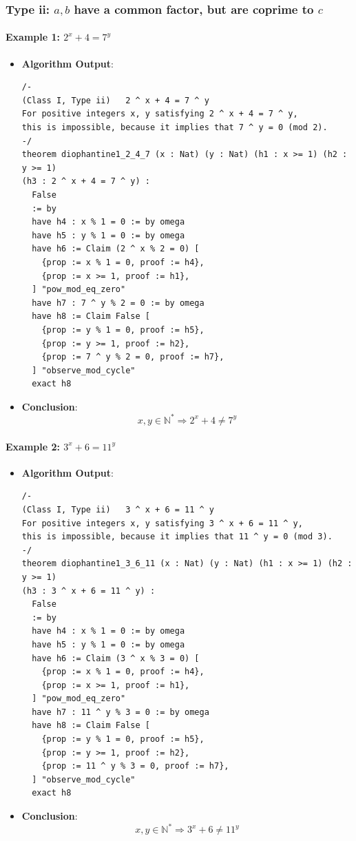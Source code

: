 \documentclass{article}
\begin{document}
\subsubsection{Type ii: $a, b$ have a common factor, but are coprime to $c$}
\paragraph{Example 1: $2^x+4=7^y$}
\begin{itemize}
\item \textbf{Algorithm Output}:
    \begin{verbatim}
/-
(Class I, Type ii)   2 ^ x + 4 = 7 ^ y
For positive integers x, y satisfying 2 ^ x + 4 = 7 ^ y,
this is impossible, because it implies that 7 ^ y = 0 (mod 2).
-/
theorem diophantine1_2_4_7 (x : Nat) (y : Nat) (h1 : x >= 1) (h2 : y >= 1) 
(h3 : 2 ^ x + 4 = 7 ^ y) :      
  False
  := by
  have h4 : x % 1 = 0 := by omega
  have h5 : y % 1 = 0 := by omega
  have h6 := Claim (2 ^ x % 2 = 0) [
    {prop := x % 1 = 0, proof := h4},
    {prop := x >= 1, proof := h1},
  ] "pow_mod_eq_zero"
  have h7 : 7 ^ y % 2 = 0 := by omega
  have h8 := Claim False [
    {prop := y % 1 = 0, proof := h5},
    {prop := y >= 1, proof := h2},
    {prop := 7 ^ y % 2 = 0, proof := h7},
  ] "observe_mod_cycle"
  exact h8
    \end{verbatim}
    \item \textbf{Conclusion}:
    \[ x, y \in \mathbb{N}^* \Rightarrow 2^x + 4 \neq 7^y \]
\end{itemize}

\paragraph{Example 2: $3^x+6=11^y$}
\begin{itemize}
\item \textbf{Algorithm Output}:
    \begin{verbatim}
/-
(Class I, Type ii)   3 ^ x + 6 = 11 ^ y
For positive integers x, y satisfying 3 ^ x + 6 = 11 ^ y,
this is impossible, because it implies that 11 ^ y = 0 (mod 3).
-/
theorem diophantine1_3_6_11 (x : Nat) (y : Nat) (h1 : x >= 1) (h2 : y >= 1) 
(h3 : 3 ^ x + 6 = 11 ^ y) :    
  False
  := by
  have h4 : x % 1 = 0 := by omega
  have h5 : y % 1 = 0 := by omega
  have h6 := Claim (3 ^ x % 3 = 0) [
    {prop := x % 1 = 0, proof := h4},
    {prop := x >= 1, proof := h1},
  ] "pow_mod_eq_zero"
  have h7 : 11 ^ y % 3 = 0 := by omega
  have h8 := Claim False [
    {prop := y % 1 = 0, proof := h5},
    {prop := y >= 1, proof := h2},
    {prop := 11 ^ y % 3 = 0, proof := h7},
  ] "observe_mod_cycle"
  exact h8
    \end{verbatim}
    \item \textbf{Conclusion}:
    \[ x, y \in \mathbb{N}^* \Rightarrow 3^x + 6 \neq 11^y \]
\end{itemize}
\end{document}

